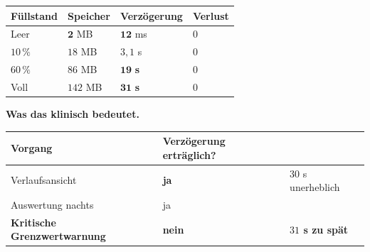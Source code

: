 \begin{merksatz}
\begin{center}
{\small
\renewcommand{\arraystretch}{1.45}
\begin{tabular}{@{}P{2.4cm}P{2.0cm}P{2.0cm}P{2.2cm}@{}}
\toprule
\textbf{Füllstand} & \textbf{Speicher} & \textbf{Verzögerung} & \textbf{Verlust}\\
\midrule
Leer & $\mathbf{2}$ MB & $\mathbf{12}$ ms & $0$\\
$10\,\%$ & $18$ MB & $3{,}1$ s & $0$\\
$60\,\%$ & $86$ MB & \textcolor{akzent}{$\mathbf{19}$ \textbf{s}} & $0$\\
Voll & \textcolor{akzent}{$142$ MB} & \textcolor{akzent}{$\mathbf{31}$ \textbf{s}} & $0$\\
\bottomrule
\end{tabular}}
\end{center}

\begin{center}
\begin{minipage}{0.88\textwidth}
\end{minipage}
\end{center}

\textbf{Was das klinisch bedeutet.}

\begin{center}
\renewcommand{\arraystretch}{1.45}
\begin{tabular}{@{}P{3.0cm}P{2.2cm}P{2.6cm}@{}}
\toprule
\textbf{Vorgang} & \textbf{Verzögerung erträglich?} & \\
\midrule
Verlaufsansicht & \textcolor{gruen}{\textbf{ja}} & $30$ s unerheblich\\
Auswertung nachts & \textcolor{gruen}{ja} & \\
\textbf{Kritische Grenzwertwarnung} & \textcolor{akzent}{\textbf{nein}} & \textcolor{akzent}{\textbf{$31$ s zu spät}}\\
\bottomrule
\end{tabular}
\end{center}

\begin{center}
\end{center}
\end{merksatz}

